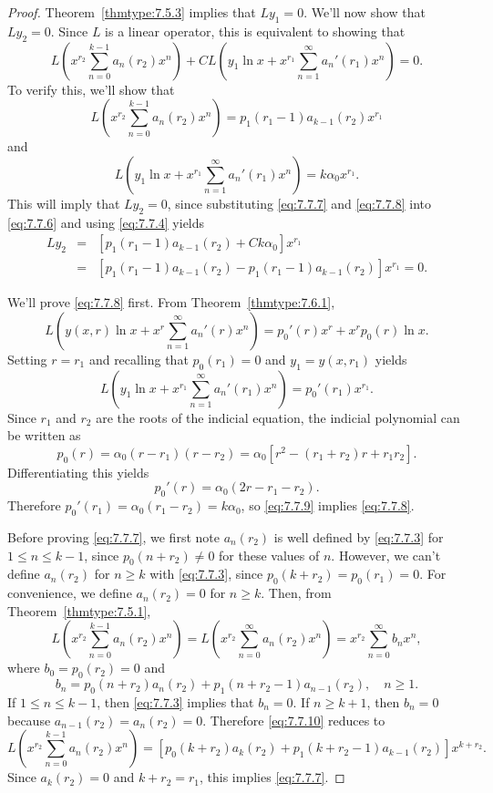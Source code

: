 \documentclass{ximera}
\begin{document}
\begin{proof}  Theorem~\ref{thmtype:7.5.3} implies that $Ly_1=0$.
We'll now show that $Ly_2=0$.
Since $L$  is a linear operator, this is equivalent to
showing that
\begin{equation} \label{eq:7.7.6}
L\left(
x^{r_2}\sum_{n=0}^{k-1}a_n(r_2)x^n\right)+CL\left(y_1\ln
x+x^{r_1}\sum_{n=1}^\infty a_n'(r_1)x^n\right)=0.
\end{equation}
To verify this, we'll show that
\begin{equation} \label{eq:7.7.7}
L\left(x^{r_2}\sum_{n=0}^{k-1}
a_n(r_2)x^n\right)=p_1(r_1-1)a_{k-1}(r_2)x^{r_1}
\end{equation}
and
\begin{equation} \label{eq:7.7.8}
L\left(y_1\ln x+x^{r_1}\sum_{n=1}^\infty
a_n'(r_1)x^n\right)=k\alpha_0x^{r_1}.
\end{equation}
This will imply that $Ly_2=0$, since substituting \eqref{eq:7.7.7}
and \eqref{eq:7.7.8} into \eqref{eq:7.7.6} and using \eqref{eq:7.7.4}
yields
\begin{eqnarray*}
Ly_2&=&\left[p_1(r_1-1)a_{k-1}(r_2)+Ck\alpha_0\right]x^{r_1}\\
&=&\left[p_1(r_1-1)a_{k-1}(r_2)-p_1(r_1-1)a_{k-1}(r_2)\right]x^{r_1}=0.
\end{eqnarray*}


We'll prove \eqref{eq:7.7.8} first. From
Theorem~\ref{thmtype:7.6.1},
$$
L\left(y(x,r)\ln x+x^r\sum_{n=1}^\infty
a_n'(r)x^n\right)=p_0'(r)x^r+x^rp_0(r)\ln x.
$$
Setting $r=r_1$ and recalling that $p_0(r_1)=0$ and $y_1=y(x,r_1)$
yields
\begin{equation} \label{eq:7.7.9}
L\left(y_1\ln x+x^{r_1}\sum_{n=1}^\infty
a_n'(r_1)x^n\right)=p_0'(r_1)x^{r_1}.
\end{equation}
Since $r_1$ and $r_2$ are the roots of the indicial equation, the
indicial polynomial can be written as
$$
p_0(r)=\alpha_0(r-r_1)(r-r_2)=\alpha_0\left[r^2-(r_1+r_2)r+r_1r_2\right].
$$
Differentiating this yields
$$
p_0'(r)=\alpha_0(2r-r_1-r_2).
$$
Therefore $p_0'(r_1)=\alpha_0(r_1-r_2)=k\alpha_0$,
so \eqref{eq:7.7.9} implies \eqref{eq:7.7.8}.

Before proving \eqref{eq:7.7.7}, we first note $a_n(r_2)$ is well
defined by \eqref{eq:7.7.3} for $1\leq n\leq k-1$, since $p_0(n+r_2)\neq 0$
for these values of $n$. However, we can't define $a_n(r_2)$ for
$n\geq k$ with \eqref{eq:7.7.3}, since $p_0(k+r_2)=p_0(r_1)=0$.
For convenience, we define  $a_n(r_2)=0$ for $n\geq k$. Then, from
Theorem~\ref{thmtype:7.5.1},
\begin{equation} \label{eq:7.7.10}
L\left(x^{r_2}\sum_{n=0}^{k-1} a_n(r_2)x^n\right)=
L\left(x^{r_2}\sum_{n=0}^\infty a_n(r_2)x^n\right)=
x^{r_2}\sum_{n=0}^\infty b_nx^n,
\end{equation}
where $b_0=p_0(r_2)=0$  and
$$
b_n=p_0(n+r_2)a_n(r_2)+p_1(n+r_2-1)a_{n-1}(r_2),\quad n\geq 1.
$$
If $1\leq n\leq k-1$, then \eqref{eq:7.7.3} implies that $b_n=0$.
If $n\geq k+1$, then $b_n=0$  because $a_{n-1}(r_2)=a_n(r_2)=0$.
Therefore \eqref{eq:7.7.10} reduces to
$$
L\left(x^{r_2}\sum_{n=0}^{k-1} a_n(r_2)x^n\right)=
\left[p_0(k+r_2)a_k(r_2)+p_1(k+r_2-1)a_{k-1}(r_2)
\right]x^{k+r_2}.
$$
Since $a_k(r_2)=0$ and $k+r_2=r_1$, this implies \eqref{eq:7.7.7}.


\end{proof}
\end{document}
